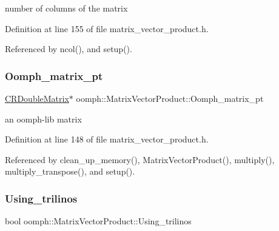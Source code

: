 number of columns of the matrix 



Definition at line 155 of file matrix\+\_\+vector\+\_\+product.\+h.



Referenced by ncol(), and setup().

\mbox{\label{classoomph_1_1MatrixVectorProduct_a3932cd524581a670528ee807bf28ff1a}} 
\subsubsection{\texorpdfstring{Oomph\+\_\+matrix\+\_\+pt}{Oomph\_matrix\_pt}}
{\footnotesize\ttfamily \hyperlink{classoomph_1_1CRDoubleMatrix}{C\+R\+Double\+Matrix}$\ast$ oomph\+::\+Matrix\+Vector\+Product\+::\+Oomph\+\_\+matrix\+\_\+pt\hspace{0.3cm}{\ttfamily [private]}}



an oomph-\/lib matrix 



Definition at line 148 of file matrix\+\_\+vector\+\_\+product.\+h.



Referenced by clean\+\_\+up\+\_\+memory(), Matrix\+Vector\+Product(), multiply(), multiply\+\_\+transpose(), and setup().

\mbox{\label{classoomph_1_1MatrixVectorProduct_ad912d5eeef011117feef7af1cabeb631}} 
\subsubsection{\texorpdfstring{Using\+\_\+trilinos}{Using\_trilinos}}
{\footnotesize\ttfamily bool oomph\+::\+Matrix\+Vector\+Product\+::\+Using\+\_\+trilinos\hspace{0.3cm}{\ttfamily [private]}}




